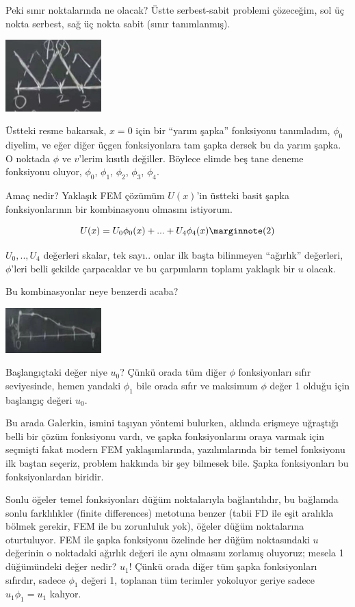 \documentclass[12pt,fleqn]{article}\usepackage{../../common}
\begin{document}
Peki sınır noktalarında ne olacak? Üstte serbest-sabit problemi çözeceğim,
sol üç nokta serbest, sağ üç nokta sabit (sınır tanımlanmış). 

\includegraphics[width=10em]{compscieng_1_18_02.png}

Üstteki resme bakarsak, $x=0$ için bir ``yarım şapka'' fonksiyonu tanımladım,
$\phi_0$ diyelim, ve eğer diğer üçgen fonksiyonlara tam şapka dersek bu da yarım
şapka. O noktada $\phi$ ve $v$'lerim kısıtlı değiller. Böylece elimde beş tane
deneme fonksiyonu oluyor, $\phi_0$, $\phi_1$, $\phi_2$, $\phi_3$, $\phi_4$.

Amaç nedir? Yaklaşık FEM çözümüm $U(x)$'in üstteki basit şapka fonksiyonlarının
bir kombinasyonu olmasını istiyorum.

$$
U(x) = U_0 \phi_0(x) + ... + U_4 \phi_4(x)
\mlabel{2}
$$

$U_0,..,U_4$ değerleri skalar, tek sayı.. onlar ilk başta bilinmeyen ``ağırlık''
değerleri, $\phi$'leri belli şekilde çarpacaklar ve bu çarpımların toplamı
yaklaşık bir $u$ olacak.

Bu kombinasyonlar neye benzerdi acaba? 

\includegraphics[width=10em]{compscieng_1_18_03.png}

Başlangıçtaki değer niye $u_0$? Çünkü orada tüm diğer $\phi$ fonksiyonları sıfır
seviyesinde, hemen yandaki $\phi_1$ bile orada sıfır ve maksimum $\phi$ değer 1
olduğu için başlangıç değeri $u_0$.

Bu arada Galerkin, ismini taşıyan yöntemi bulurken, aklında erişmeye uğraştığı
belli bir çözüm fonksiyonu vardı, ve şapka fonksiyonlarını oraya varmak için
seçmişti fakat modern FEM yaklaşımlarında, yazılımlarında bir temel fonksiyonu
ilk baştan seçeriz, problem hakkında bir şey bilmesek bile. Şapka fonksiyonları
bu fonksiyonlardan biridir.

Sonlu öğeler temel fonksiyonları düğüm noktalarıyla bağlantılıdır, bu bağlamda
sonlu farklılıkler (finite differences) metotuna benzer (tabii FD ile eşit
aralıkla bölmek gerekir, FEM ile bu zorunluluk yok), öğeler düğüm noktalarına
oturtuluyor. FEM ile şapka fonksiyonu özelinde her düğüm noktasındaki $u$
değerinin o noktadaki ağırlık değeri ile aynı olmasını zorlamış oluyoruz; mesela
1 düğümündeki değer nedir? $u_1$! Çünkü orada diğer tüm şapka fonksiyonları
sıfırdır, sadece $\phi_1$ değeri 1, toplanan tüm terimler yokoluyor geriye
sadece $u_1 \phi_1 = u_1$ kalıyor.
\end{document}
